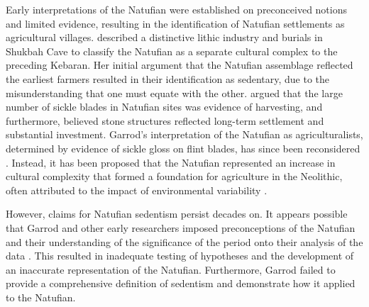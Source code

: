 \documentclass[%
	]{ijsra}
\begin{document}
Early interpretations of the Natufian were established on preconceived notions and limited evidence, resulting in the identification of Natufian settlements as agricultural villages. \textcite{Garrod_1957} described a distinctive lithic industry and burials in Shukbah Cave to classify the Natufian as a separate cultural complex to the preceding Kebaran. Her initial argument that the Natufian assemblage reflected the earliest farmers resulted in their identification as sedentary, due to the misunderstanding that one must equate with the other. 
\textcite{Garrod_1957} argued that the large number of sickle blades in Natufian sites was evidence of harvesting, and furthermore, believed stone structures reflected long-term settlement and substantial investment. 
Garrod’s interpretation of the Natufian as agriculturalists, determined by evidence of sickle gloss on flint blades, has since been reconsidered \parencite[75]{Lieberman_1999}. 
Instead, it has been proposed that the Natufian represented an increase in cultural complexity that formed a foundation for agriculture in the Neolithic, often attributed to the impact of environmental variability \parencite[447]{Bar-Yosef_1989}. 

However, claims for Natufian sedentism persist decades on. It appears possible that Garrod and other early researchers imposed preconceptions of the Natufian and their understanding of the significance of the period onto their analysis of the data \parencite{Finlayson_2013}.
This resulted in inadequate testing of hypotheses and the development of an inaccurate representation of the Natufian. Furthermore, Garrod failed to provide a comprehensive definition of sedentism and demonstrate how it applied to the Natufian.
\end{document}
